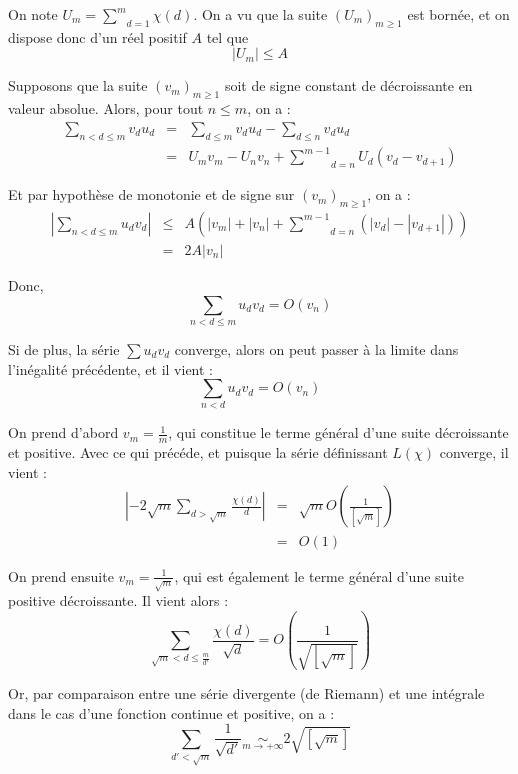 On note $U_m = \underset{d = 1}{\overset{m}{\sum}} \chi (d)$. On a vu que la
suite $(U_m)_{m \geqslant 1}$ est born{\'e}e, et on dispose donc d'un r{\'e}el
positif $A$ tel que
\[ | U_m | \leqslant A \]


Supposons que la suite $(v_m)_{m \geqslant 1}$ soit de signe constant de
d{\'e}croissante en valeur absolue. Alors, pour tout $n \leqslant m$, on a :
\begin{eqnarray*}
  \underset{n < d \leqslant m}{\sum} v_d u_d & = & \underset{d \leqslant
  m}{\sum} v_d u_d - \underset{d \leqslant n}{\sum} v_d u_d\\
  & = & U_m v_m - U_n v_n + \underset{d = n}{\overset{m - 1}{\sum}} U_d (v_d
  - v_{d + 1})
\end{eqnarray*}


Et par hypoth{\`e}se de monotonie et de signe sur $(v_m)_{m \geqslant 1}$, on
a :
\begin{eqnarray*}
  \left| \underset{n < d \leqslant m}{\sum} u_d v_d \right| & \leqslant & A
  \left( | v_m | + | v_n | + \underset{d = n}{\overset{m - 1}{\sum}} (| v_d |
  - | v_{d + 1} |) \right)\\
  & = & 2 A | v_n |
\end{eqnarray*}


Donc,
\[ \underset{n < d \leqslant m}{\sum} u_d v_d = O (v_n) \]


Si de plus, la s{\'e}rie $\sum u_d v_d$ converge, alors on peut passer {\`a}
la limite dans l'in{\'e}galit{\'e} pr{\'e}c{\'e}dente, et il vient :
\[ \underset{n < d}{\sum} u_d v_d = O (v_n) \]


On prend d'abord $v_m = \frac{1}{m}$, qui constitue le terme g{\'e}n{\'e}ral
d'une suite d{\'e}croissante et positive. Avec ce qui pr{\'e}c{\'e}de, et
puisque la s{\'e}rie d{\'e}finissant $L (\chi)$ converge, il vient :
\begin{eqnarray*}
  \left| - 2 \sqrt{m} \underset{d > \sqrt{m}}{\sum} \frac{\chi (d)}{d} \right|
  & = & \sqrt{m} O \left( \frac{1}{\left[ \sqrt{m} \right]} \right)\\
  & = & O (1)
\end{eqnarray*}


On prend ensuite $v_m = \frac{1}{\sqrt{m}}$, qui est {\'e}galement le terme
g{\'e}n{\'e}ral d'une suite positive d{\'e}croissante. Il vient alors :
\[ \underset{\sqrt{m} < d \leqslant \frac{m}{d'}}{\sum} \frac{\chi
   (d)}{\sqrt{d}} = O \left( \frac{1}{\sqrt{\left[ \sqrt{m} \right]}} \right)
\]


Or, par comparaison entre une s{\'e}rie divergente (de Riemann) et une
int{\'e}grale dans le cas d'une fonction continue et positive, on a :
\[ \underset{d' < \sqrt{m}}{\sum} \frac{1}{\sqrt{d'}} \underset{m \rightarrow
   + \infty}{\sim} 2 \sqrt{\left[ \sqrt{m} \right]} \]


